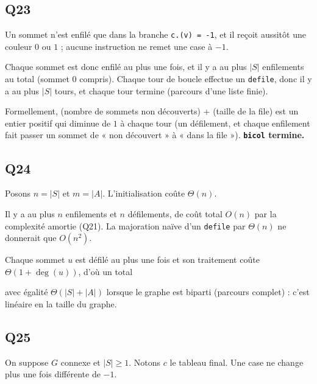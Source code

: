 \documentclass[11pt,a4paper]{article}
\newcommand{\equationajustee}[1]{%
  \sbox{\boiteequation}{$\displaystyle #1$}%
  \ifdim\wd\boiteequation>\linewidth
    \[\resizebox{\linewidth}{!}{\usebox{\boiteequation}}\]%
  \else
    \[#1\]%
  \fi}
\begin{document}
\hypertarget{q23}{%
\subsection{Q23}\label{q23}}

Un sommet n'est enfilé que dans la branche \texttt{c.(v)\ =\ -1}, et il reçoit aussitôt une couleur \(0\) ou \(1\) ; aucune instruction ne remet une case à \(-1\).

Chaque sommet est donc enfilé au plus une fois, et il y a au plus \(|S|\) enfilements au total (sommet \(0\) compris). Chaque tour de boucle effectue un \texttt{defile}, donc il y a au plus \(|S|\) tours, et chaque tour termine (parcours d'une liste finie).

Formellement, (nombre de sommets non découverts) + (taille de la file) est un entier positif qui diminue de \(1\) à chaque tour (un défilement, et chaque enfilement fait passer un sommet de « non découvert » à « dans la file »). \textbf{\texttt{bicol} termine.}

\hypertarget{q24}{%
\subsection{Q24}\label{q24}}

Posons \(n = |S|\) et \(m = |A|\). L'initialisation coûte \(\Theta(n)\).

Il y a au plus \(n\) enfilements et \(n\) défilements, de coût total \(O(n)\) par la complexité amortie (Q21). La majoration naïve d'un \texttt{defile} par \(\Theta(n)\) ne donnerait que \(O(n^2)\).

Chaque sommet \(u\) est défilé au plus une fois et son traitement coûte \(\Theta(1 + \deg(u))\), d'où un total

\equationajustee{\sum_u \Theta(1 + \deg u) = \Theta(n + 2m).}

\equationajustee{\boxed{\,C(\texttt{bicol}) = O(|S| + |A|)\,}}

avec égalité \(\Theta(|S| + |A|)\) lorsque le graphe est biparti (parcours complet) : c'est linéaire en la taille du graphe.

\hypertarget{q25}{%
\subsection{Q25}\label{q25}}

On suppose \(G\) connexe et \(|S| \ge 1\). Notons \(c\) le tableau final. Une case ne change plus une fois différente de \(-1\).
\end{document}
